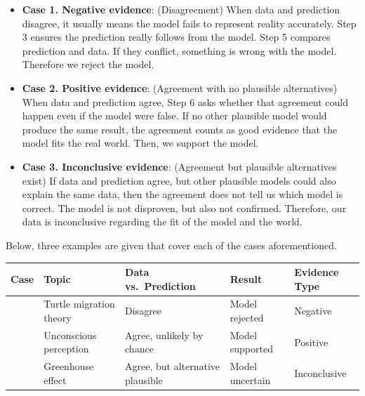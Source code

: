 \documentclass[
  12pt,
]{book}
\begin{document}
\begin{itemize}
\item
  \textbf{Case 1. Negative evidence}: (Disagreement) When data and prediction disagree, it usually means the model fails to represent reality accurately. Step 3 ensures the prediction really follows from the model. Step 5 compares prediction and data. If they conflict, something is wrong with the model. Therefore we reject the model.
\item
  \textbf{Case 2. Positive evidence}: (Agreement with no plausible alternatives) When data and prediction agree, Step 6 asks whether that agreement could happen even if the model were false. If no other plausible model would produce the same result, the agreement counts as good evidence that the model fits the real world. Then, we support the model.
\item
  \textbf{Case 3. Inconclusive evidence}: (Agreement but plausible alternatives exist) If data and prediction agree, but other plausible models could also explain the same data, then the agreement does not tell us which model is correct. The model is not disproven, but also not confirmed. Therefore, our data is inconclusive regarding the fit of the model and the world.
\end{itemize}

Below, three examples are given that cover each of the cases aforementioned.

\begin{longtable}[]{@{}
  >{\raggedright\arraybackslash}p{}
  >{\raggedright\arraybackslash}p{}
  >{\raggedright\arraybackslash}p{}
  >{\raggedright\arraybackslash}p{}
  >{\raggedright\arraybackslash}p{}@{}}
\toprule\noalign{}
\begin{minipage}[b]{\linewidth}\raggedright
Case
\end{minipage} & \begin{minipage}[b]{\linewidth}\raggedright
Topic
\end{minipage} & \begin{minipage}[b]{\linewidth}\raggedright
Data vs.~Prediction
\end{minipage} & \begin{minipage}[b]{\linewidth}\raggedright
Result
\end{minipage} & \begin{minipage}[b]{\linewidth}\raggedright
Evidence Type
\end{minipage} \\
\midrule\noalign{}
\endhead
\bottomrule\noalign{}
\endlastfoot
1 & Turtle migration theory & Disagree & Model rejected & Negative \\
2 & Unconscious perception & Agree, unlikely by chance & Model supported & Positive \\
3 & Greenhouse effect & Agree, but alternative plausible & Model uncertain & Inconclusive \\
\end{longtable}
\end{document}
